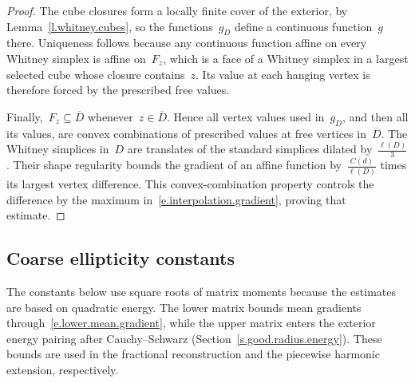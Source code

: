 \documentclass[11pt,letterpaper]{article}
\numberwithin{equation}{section}
\theoremstyle{definition}
\renewcommand{\subset}{\subseteq}
\begin{document}
\begin{proof}
\smallskip

The cube closures form a locally finite cover of the exterior, by Lemma~\ref{l.whitney.cubes}, so the functions~$g_D$ define a continuous function~$g$ there. Uniqueness follows because any continuous function affine on every Whitney simplex is affine on~$F_z$, which is a face of a Whitney simplex in a largest selected cube whose closure contains~$z$. Its value at each hanging vertex is therefore forced by the prescribed free values.

\smallskip

Finally,~$F_z\subset\overline D$ whenever~$z\in\overline D$. Hence all vertex values used in~$g_D$, and then all its values, are convex combinations of prescribed values at free vertices in~$\overline D$. The Whitney simplices in~$D$ are translates of the standard simplices dilated by~$\frac{\ell(D)}3$. Their shape regularity bounds the gradient of an affine function by~$\frac{C(d)}{\ell(D)}$ times its largest vertex difference. This convex-combination property controls the difference by the maximum in~\eqref{e.interpolation.gradient}, proving that estimate.
\end{proof}


\subsection{Coarse ellipticity constants}

The constants below use square roots of matrix moments because the estimates are based on quadratic energy. The lower matrix bounds mean gradients through~\eqref{e.lower.mean.gradient}, while the upper matrix enters the exterior energy pairing after Cauchy--Schwarz (Section~\ref{s.good.radius.energy}). These bounds are used in the fractional reconstruction and the piecewise harmonic extension, respectively.
\end{document}
